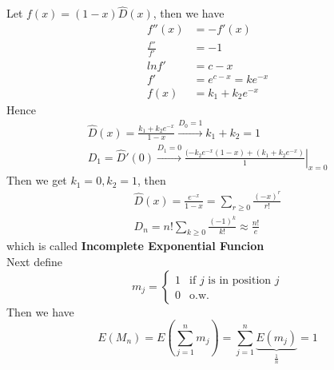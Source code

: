\documentclass{article}
\newcommand{\twopartdef}[4]
{
  \left\{
    \begin{array}{ll}
      #1 & \mbox{if } #2 \\
      #3 & \mbox{} #4 
    \end{array}
  \right.
}
\begin{document}
Let $f(x)=(1-x)\hat{D}(x)$, then we have\\
\begin{align*}
  f''(x)&=-f'(x)\\
  \frac{f''}{f'}&=-1\\
  lnf'&=c-x\\
  f'&=e^{c-x}=ke^{-x}\\
  f(x)&=k_1+k_2e^{-x}
\end{align*}
Hence\\
\begin{align*}
  \hat{D}(x)=\frac{k_1+k_2e^{-x}}{1-x}\xrightarrow{D_0=1}k_1+k_2=1 \\
  D_1=\hat{D}'(0)\xrightarrow{D_1=0} 
  \left.\frac{(-k_2e^{-x}(1-x)+(k_1+k_2e^{-x})}{1}\right|_{x=0} 
\end{align*}
Then we get \(k_1=0, k_2=1\), then
\begin{align*}
  \hat{D}(x)=\frac{e^{-x}}{1-x}=\sum_{r\geq 0}\frac{(-x)^r}{r!} \\
  D_n=n!\sum_{k\geq 0}\frac{(-1)^k}{k!}\approx \frac{n!}{e}
\end{align*}
which is called \textbf{Incomplete Exponential Funcion}\\
Next define \\
\[m_j=\twopartdef{1}{j\text{ is in position }j}{0}{\text{o.w.}}\]
Then we have
\[E(M_n)=E\left(\sum_{j=1}^nm_j\right)=\sum_{j=1}^n\underbrace{E(m_j)}_{\frac{1}{n}}=1\]
\end{document}

